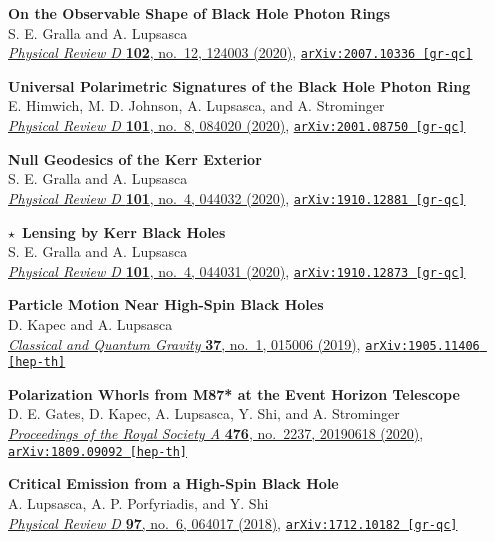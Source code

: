 \documentclass[margin,line]{resume}
\begin{document}
\begin{resume}
\textbf{On the Observable Shape of Black Hole Photon Rings} \\
S. E. Gralla and A. Lupsasca \\
\href{https://doi.org/10.1103/PhysRevD.102.124003}{\textit{Physical Review D} \textbf{102}, no.~12, 124003 (2020)}, \texttt{\href{https://arxiv.org/abs/2007.10336}{arXiv:2007.10336 [gr-qc]}}

\textbf{Universal Polarimetric Signatures of the Black Hole Photon Ring} \\
E. Himwich, M. D. Johnson, A. Lupsasca, and A. Strominger \\
\href{https://doi.org/10.1103/PhysRevD.101.084020}{\textit{Physical Review D} \textbf{101}, no.~8, 084020 (2020)}, \texttt{\href{https://arxiv.org/abs/2001.08750}{arXiv:2001.08750 [gr-qc]}}

\textbf{Null Geodesics of the Kerr Exterior} \\
S. E. Gralla and A. Lupsasca \\
\href{https://doi.org/10.1103/PhysRevD.101.044032}{\textit{Physical Review D} \textbf{101}, no.~4, 044032 (2020)}, \texttt{\href{https://arxiv.org/abs/arXiv:1910.12881}{arXiv:1910.12881 [gr-qc]}}

\hspace{-9pt}$\star$\ \textbf{Lensing by Kerr Black Holes} \\
S. E. Gralla and A. Lupsasca \\
\href{https://doi.org/10.1103/PhysRevD.101.044031}{\textit{Physical Review D} \textbf{101}, no.~4, 044031 (2020)}, \texttt{\href{https://arxiv.org/abs/1910.12873}{arXiv:1910.12873 [gr-qc]}}

\textbf{Particle Motion Near High-Spin Black Holes} \\
D. Kapec and A. Lupsasca \\
\href{https://doi.org/10.1088/1361-6382/ab519e}{\textit{Classical and Quantum Gravity} \textbf{37}, no.~1, 015006 (2019)}, \texttt{\href{https://arxiv.org/abs/arXiv:1905.11406}{arXiv:1905.11406 [hep-th]}}

\textbf{Polarization Whorls from M87* at the Event Horizon Telescope} \\
D. E. Gates, D. Kapec, A. Lupsasca, Y. Shi, and A. Strominger \\
\href{https://doi.org/10.1098/rspa.2019.0618}{\textit{Proceedings of the Royal Society A} \textbf{476}, no.~2237, 20190618 (2020)}, \texttt{\href{https://arxiv.org/abs/arXiv:1809.09092}{arXiv:1809.09092 [hep-th]}}

\textbf{Critical Emission from a High-Spin Black Hole} \\
A. Lupsasca, A. P. Porfyriadis, and Y. Shi \\
\href{https://doi.org/10.1103/PhysRevD.97.064017}{\textit{Physical Review D} \textbf{97}, no.~6, 064017 (2018)}, \texttt{\href{https://arxiv.org/abs/arXiv:1712.10182}{arXiv:1712.10182 [gr-qc]}}


\end{resume}
\end{document}
